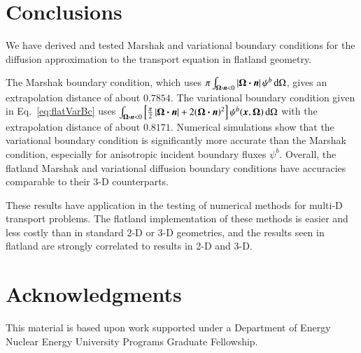 \documentclass{anstrans}
\begin{document}
\section{Conclusions}
We have derived and tested Marshak and variational boundary
conditions for the diffusion approximation to the transport equation in
flatland geometry. 

The Marshak boundary condition, which uses $\pi \int_{\bm{\Omega}\bm{\cdot} \bm{n} <
0 } \left| \bm{\Omega}\bm{\cdot} \bm{n} \right| \psi^b \mathop{}\!\mathrm{d}\Omega$, gives an extrapolation
distance of about $0.7854$.  The variational boundary condition given in
Eq.~\eqref{eq:flatVarBc} uses $\int_{\bm{\Omega}\bm{\cdot}\bm{n} < 0} \left[
\frac{\pi}{2} \left| \bm{\Omega}\bm{\cdot}\bm{n} \right| + 2 (\bm{\Omega}\bm{\cdot}\bm{n})^2
\right] \psi^b(\bm{x}, \bm{\Omega}) \mathop{}\!\mathrm{d}\Omega$ with the extrapolation
distance of about $0.8171$. Numerical simulations show that the variational
boundary condition is significantly more accurate than the Marshak condition,
especially for anisotropic incident boundary fluxes $\psi^b$. Overall, the
flatland Marshak and variational diffusion boundary conditions have accuracies
comparable to their 3-D counterparts. 

These results have application in the testing of numerical methods for multi-D
transport problems. The flatland implementation of these methods is easier and
less costly than in standard 2-D or 3-D geometries, and the results seen in
flatland are strongly correlated to results in 2-D and 3-D.

\section{Acknowledgments}
This material is based upon work supported under a Department of Energy Nuclear
Energy University Programs Graduate Fellowship.



\end{document}
